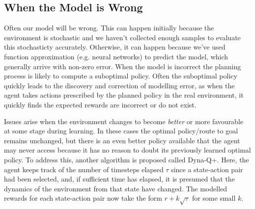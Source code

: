 \subsection{When the Model is Wrong}
Often our model will be wrong. This can happen initially because the environment is stochastic and we haven't collected enough samples to evaluate this stochasticty accurately. Otherwise, it can happen because we've used function approximation (e.g. neural networks) to predict the model, which generally arrive with non-zero error. When the model is incorrect the planning process is likely to compute a suboptimal policy. Often the suboptimal policy quickly leads to the discovery and correction of modelling error, as when the agent takes actions prescribed by the planned policy in the real environment, it quickly finds the expected rewards are incorrect or do not exist. 

Issues arise when the environment changes to become \textit{better} or more favourable at some stage during learning. In these cases the optimal policy/route to goal remains unchanged, but there is an even better policy available that the agent may never access because it has no reason to doubt its previously learned optimal policy. To address this, another algorithm is proposed called Dyna-Q+. Here, the agent keeps track of the number of timesteps elapsed $\tau$ since a state-action pair had been selected, and, if sufficient time has elapsed, it is presumed that the dynamics of the environment from that state have changed. The modelled rewards for each state-action pair now take the form $r + k\sqrt{\tau}$ for some small $k$.

